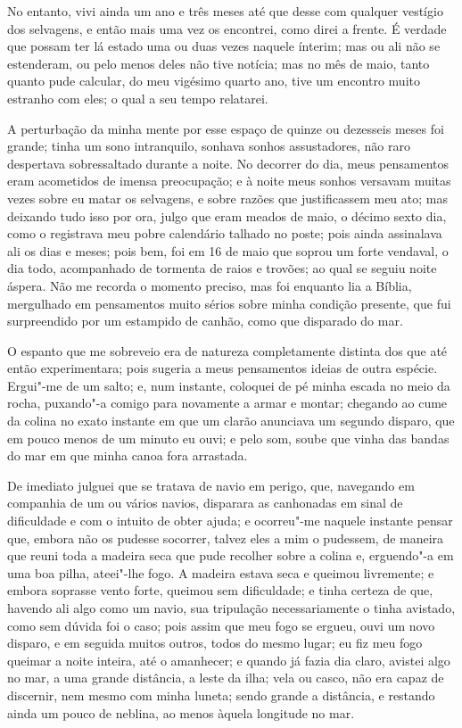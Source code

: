 No entanto, vivi ainda um ano e três meses até que desse com qualquer
vestígio dos selvagens, e então mais uma vez os encontrei, como direi a
frente. É verdade que possam ter lá estado uma ou duas vezes naquele
ínterim; mas ou ali não se estenderam, ou pelo menos deles não tive
notícia; mas no mês de maio, tanto quanto pude calcular, do meu vigésimo
quarto ano, tive um encontro muito estranho com eles; o qual a seu tempo
relatarei.

A perturbação da minha mente por esse espaço de quinze ou dezesseis
meses foi grande; tinha um sono intranquilo, sonhava sonhos
assustadores, não raro despertava sobressaltado durante a noite. No
decorrer do dia, meus pensamentos eram acometidos de imensa preocupação;
e à noite meus sonhos versavam muitas vezes sobre eu matar os selvagens,
e sobre razões que justificassem meu ato; mas deixando tudo isso por
ora, julgo que eram meados de maio, o décimo sexto dia, como o
registrava meu pobre calendário talhado no poste; pois ainda assinalava
ali os dias e meses; pois bem, foi em 16 de maio que soprou um forte
vendaval, o dia todo, acompanhado de tormenta de raios e trovões; ao
qual se seguiu noite áspera. Não me recorda o momento preciso, mas foi
enquanto lia a Bíblia, mergulhado em pensamentos muito sérios sobre
minha condição presente, que fui surpreendido por um estampido de
canhão, como que disparado do mar.

O espanto que me sobreveio era de natureza completamente distinta dos
que até então experimentara; pois sugeria a meus pensamentos ideias de
outra espécie. Ergui"-me de um salto; e, num instante, coloquei de pé
minha escada no meio da rocha, puxando"-a comigo para novamente a armar e
montar; chegando ao cume da colina no exato instante em que um clarão
anunciava um segundo disparo, que em pouco menos de um minuto eu ouvi; e
pelo som, soube que vinha das bandas do mar em que minha canoa fora
arrastada.

De imediato julguei que se tratava de navio em perigo, que, navegando em
companhia de um ou vários navios, disparara as canhonadas em sinal de
dificuldade e com o intuito de obter ajuda; e ocorreu"-me naquele
instante pensar que, embora não os pudesse socorrer, talvez eles a mim o
pudessem, de maneira que reuni toda a madeira seca que pude recolher
sobre a colina e, erguendo"-a em uma boa pilha, ateei"-lhe fogo. A madeira
estava seca e queimou livremente; e embora soprasse vento forte, queimou
sem dificuldade; e tinha certeza de que, havendo ali algo como um navio,
sua tripulação necessariamente o tinha avistado, como sem dúvida foi o
caso; pois assim que meu fogo se ergueu, ouvi um novo disparo, e em
seguida muitos outros, todos do mesmo lugar; eu fiz meu fogo queimar a
noite inteira, até o amanhecer; e quando já fazia dia claro, avistei
algo no mar, a uma grande distância, a leste da ilha; vela ou casco, não
era capaz de discernir, nem mesmo com minha luneta; sendo grande a
distância, e restando ainda um pouco de neblina, ao menos àquela
longitude no mar.


